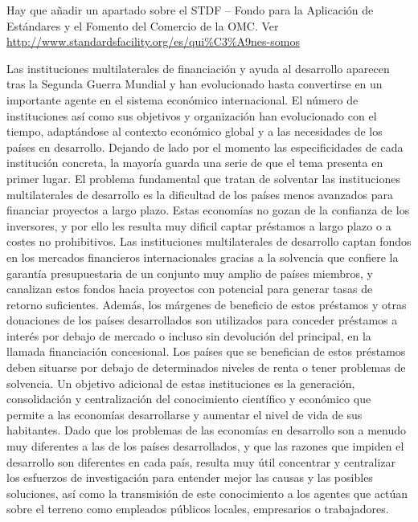 \documentclass{nuevotema}
\begin{document}
\ideaclave

Hay que añadir un apartado sobre el STDF -- Fondo para la Aplicación de Estándares y el Fomento del Comercio de la OMC. Ver \url{http://www.standardsfacility.org/es/qui\%C3\%A9nes-somos}

Las instituciones multilaterales de financiación y ayuda al desarrollo aparecen tras la Segunda Guerra Mundial y han evolucionado hasta convertirse en un importante agente en el sistema económico internacional. El número de instituciones así como sus objetivos y organización han evolucionado con el tiempo, adaptándose al contexto económico global y a las necesidades de los países en desarrollo. Dejando de lado por el momento las especificidades de cada institución concreta, la mayoría guarda una serie de  que el tema presenta en primer lugar. El problema fundamental que tratan de solventar las instituciones multilaterales de desarrollo es la dificultad de los países menos avanzados para financiar proyectos a largo plazo. Estas economías no gozan de la confianza de los inversores, y por ello les resulta muy dificil captar préstamos a largo plazo o a costes no prohibitivos. Las instituciones multilaterales de desarrollo captan fondos en los mercados financieros internacionales gracias a la solvencia que confiere la garantía presupuestaria de un conjunto muy amplio de países miembros, y canalizan estos fondos hacia proyectos con potencial para generar tasas de retorno suficientes. Además, los márgenes de beneficio de estos préstamos y otras donaciones de los países desarrollados son utilizados para conceder préstamos a interés por debajo de mercado o incluso sin devolución del principal, en la llamada financiación concesional. Los países que se benefician de estos préstamos deben situarse por debajo de determinados niveles de renta o tener problemas de solvencia. Un objetivo adicional de estas instituciones es la generación, consolidación y centralización del conocimiento científico y económico que permite a las economías desarrollarse y aumentar el nivel de vida de sus habitantes. Dado que los problemas de las economías en desarrollo son a menudo muy diferentes a las de los países desarrollados, y que las razones que impiden el desarrollo son diferentes en cada país, resulta muy útil concentrar y centralizar los esfuerzos de investigación para entender mejor las causas y las posibles soluciones, así como la transmisión de este conocimiento a los agentes que actúan sobre el terreno como empleados públicos locales, empresarios o trabajadores. 
\end{document}
